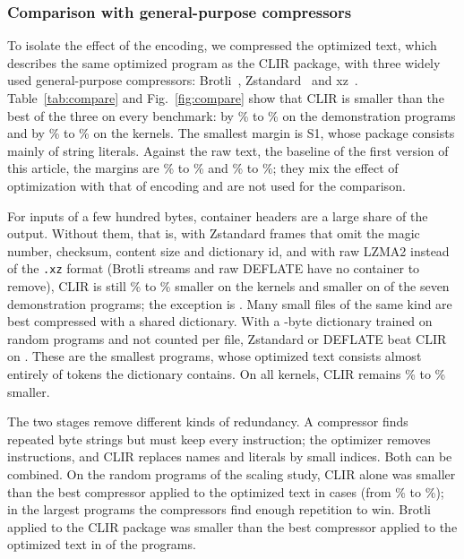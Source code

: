\documentclass{ieeeaccess}
\newcommand{\clir}{CLIR}
\begin{document}
\subsubsection{Comparison with general-purpose compressors}
To isolate the effect of the encoding, we compressed the optimized text, which describes the same optimized program as the \clir{} package, with three widely used general-purpose compressors: Brotli~\cite{alakuijala2019brotli}, Zstandard~\cite{collet2021zstd} and xz~\cite{tukaani2024xz}. Table~\ref{tab:compare} and Fig.~\ref{fig:compare} show that \clir{} is smaller than the best of the three on every benchmark: by \ncmpFramedSMin\% to \ncmpFramedSMax\% on the demonstration programs and by \ncmpFramedKMin\% to \ncmpFramedKMax\% on the kernels. The smallest margin is S1, whose package consists mainly of string literals. Against the raw text, the baseline of the first version of this article, the margins are \ncmpRawTextSMin\% to \ncmpRawTextSMax\% and \ncmpRawTextKMin\% to \ncmpRawTextKMax\%; they mix the effect of optimization with that of encoding and are not used for the comparison.

For inputs of a few hundred bytes, container headers are a large share of the output. Without them, that is, with Zstandard frames that omit the magic number, checksum, content size and dictionary id, and with raw LZMA2 instead of the \texttt{.xz} format (Brotli streams and raw DEFLATE have no container to remove), \clir{} is still \ncmpHdrlessKMin\% to \ncmpHdrlessKMax\% smaller on the kernels and smaller on \ncmpHdrlessSWins{} of the seven demonstration programs; the exception is \nhdrLosers. Many small files of the same kind are best compressed with a shared dictionary. With a \ndictBytes-byte dictionary trained on \ndictTraining{} random programs and not counted per file, Zstandard or DEFLATE beat \clir{} on \ndictLosers. These are the smallest programs, whose optimized text consists almost entirely of tokens the dictionary contains. On all kernels, \clir{} remains \ncmpDictKMin\% to \ncmpDictKMax\% smaller.

The two stages remove different kinds of redundancy. A compressor finds repeated byte strings but must keep every instruction; the optimizer removes instructions, and \clir{} replaces names and literals by small indices. Both can be combined. On the \nscaleCmpCount{} random programs of the scaling study, \clir{} alone was smaller than the best compressor applied to the optimized text in \nscaleCmpWins{} cases (from \nscaleCmpMin\% to \nscaleCmpMax\%); in the largest programs the compressors find enough repetition to win. Brotli applied to the \clir{} package was smaller than the best compressor applied to the optimized text in \nscaleClirBrotliWins{} of the \nscaleCmpCount{} programs.
\end{document}
